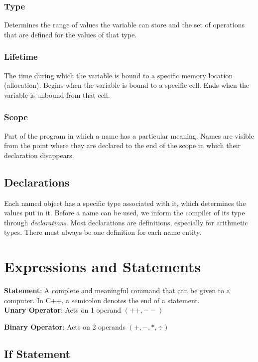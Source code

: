 \documentclass{article}
\begin{document}
	\subsubsection*{Type}
	
	Determines the range of values the variable can store and the set of operations that are defined for the values of that type.
	
	\subsubsection*{Lifetime}
	
	The time during which the variable is bound to a specific memory location (allocation). Begins when the variable is bound to a specific cell. Ends when the variable is unbound from that cell.
	
	\subsubsection*{Scope}
	
	Part of the program in which a name has a particular meaning. Names are visible from the point where they are declared to the end of the scope in which their declaration disappears.
	
	\subsection{Declarations}
	
	Each named object has a specific type associated with it, which determines the values put in it. Before a name can be used, we inform the compiler of its type through \textit{declarations}. Most declarations are definitions, especially for arithmetic types. There must always be one definition for each name entity.
	
	
	\section{Expressions and Statements}
	
	\textbf{Statement}: A complete and meaningful command that can be given to a computer. In C++, a semicolon denotes the end of a statement.\\
	
	\textbf{Unary Operator}: Acts on 1 operand $ (++,--) $
	
	\textbf{Binary Operator}: Acts on 2 operands $ (+,-,*,\div) $
	
	\subsection{If Statement}
	
\end{document}
